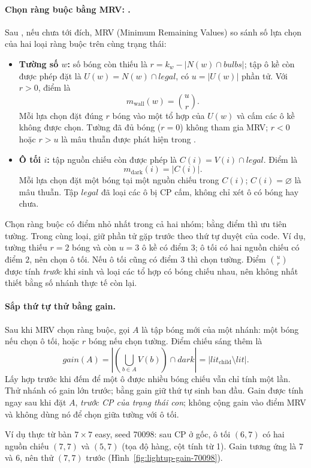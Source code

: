 \paragraph{Chọn ràng buộc bằng MRV: .}
Sau , nếu chưa tới đích, MRV (Minimum Remaining Values) so
sánh số lựa chọn của hai loại ràng buộc trên cùng trạng thái:
\begin{itemize}
\item \textbf{Tường số $w$:} số bóng còn thiếu là
$r=k_w-|N(w)\cap bulbs|$; tập ô kề còn được phép đặt là
$U(w)=N(w)\cap legal$, có $u=|U(w)|$ phần tử. Với $r>0$, điểm là
\[
 m_{\mathrm{wall}}(w)=\binom{u}{r}.
\]
Mỗi lựa chọn đặt đúng $r$ bóng vào một tổ hợp của $U(w)$ và cấm các ô kề
không được chọn. Tường đã đủ bóng ($r=0$) không tham gia MRV; $r<0$ hoặc
$r>u$ là mâu thuẫn được phát hiện trong .
\item \textbf{Ô tối $i$:} tập nguồn chiếu còn được phép là
$C(i)=V(i)\cap legal$. Điểm là
\[
 m_{\mathrm{dark}}(i)=|C(i)|.
\]
Mỗi lựa chọn đặt một bóng tại một nguồn chiếu trong $C(i)$; $C(i)=\varnothing$
là mâu thuẫn. Tập $legal$ đã loại các ô bị CP cấm, không chỉ xét ô có bóng hay chưa.
\end{itemize}
Chọn ràng buộc có điểm nhỏ nhất trong cả hai nhóm; bằng điểm thì ưu tiên
tường. Trong cùng loại, giữ phần tử gặp trước theo thứ tự duyệt của code.
Ví dụ, tường thiếu $r=2$ bóng và còn $u=3$ ô kề có điểm $3$; ô tối có hai
nguồn chiếu có điểm $2$, nên chọn ô tối. Nếu ô tối cũng có điểm $3$ thì chọn
tường. Điểm $\binom{u}{r}$ được tính \emph{trước} khi sinh và loại các tổ hợp
có bóng chiếu nhau, nên không nhất thiết bằng số nhánh thực tế còn lại.

\paragraph{Sắp thứ tự thử bằng gain.} Sau khi MRV chọn ràng buộc, gọi $A$ là
tập bóng mới của một nhánh: một bóng nếu chọn ô tối, hoặc $r$ bóng nếu chọn
tường. Điểm chiếu sáng thêm là
\[
 gain(A)=\left|\left(\bigcup_{b\in A}V(b)\right)\cap dark\right|
        =|lit_{\mathrm{child}}\setminus lit|.
\]
Lấy hợp trước khi đếm để một ô được nhiều bóng chiếu vẫn chỉ tính một lần.
Thử nhánh có gain lớn trước; bằng gain giữ thứ tự sinh ban đầu. Gain được tính
ngay sau khi đặt $A$, \emph{trước CP của trạng thái con}; không cộng gain vào
điểm MRV và không dùng nó để chọn giữa tường với ô tối.

Ví dụ thực từ bàn $7\times7$ easy, seed 70098: sau CP ở gốc, ô tối
$(6,7)$ có hai nguồn chiếu $(7,7)$ và $(5,7)$ (tọa độ hàng, cột tính từ 1).
Gain tương ứng là $7$ và $6$, nên thử $(7,7)$ trước
(Hình~\ref{fig:lightup-gain-70098}).

